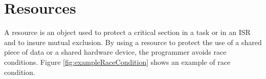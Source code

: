  

\chapter{Resources}
\label{chap:resources}

A resource is an object used to protect a critical section in a task or in an ISR and to insure mutual exclusion.
By using a resource to protect the use of a shared piece of data or a shared hardware device, the programmer avoids race conditions.
Figure \ref{fig:exampleRaceCondition} shows an example of race condition.


